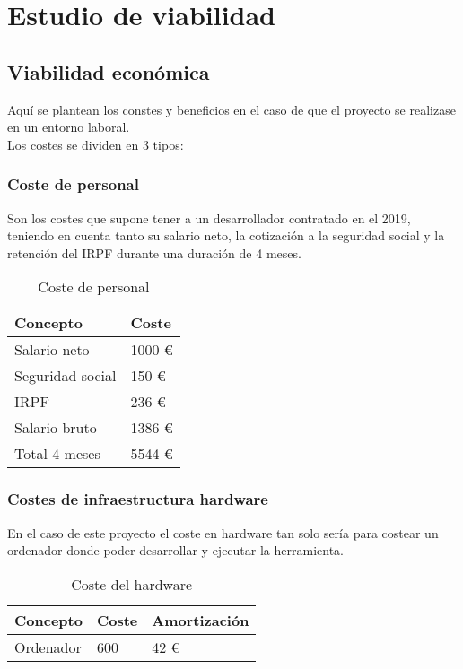 \section{Estudio de viabilidad}

\subsection{Viabilidad económica}
Aquí se plantean los constes y beneficios en el caso de que el proyecto se realizase en un entorno laboral.\\

Los costes se dividen en 3 tipos:


\subsubsection{Coste de personal}

Son los costes que supone tener a un desarrollador contratado en el 2019, teniendo en cuenta tanto su salario neto, la cotización a la seguridad social y la retención del IRPF durante una duración de 4 meses.\\

\begin{table}[H]
\begin{center}
\begin{tabular}{|l|l|}
\hline
Concepto & Coste \\
\hline \hline
Salario neto & 1000 \euro \\ \hline
Seguridad social & 150 \euro \\ \hline
IRPF & 236 \euro \\ \hline
Salario bruto & 1386 \euro \\ \hline
Total 4 meses & 5544 \euro \\ \hline
\end{tabular}
\caption{Coste de personal}

\label{tabla:sencilla}
\end{center}
\end{table}


\subsubsection{Costes de infraestructura hardware}
En el caso de este proyecto el coste en hardware tan solo sería para costear un ordenador donde poder desarrollar y ejecutar la herramienta.\\

\begin{table}[H]
\begin{center}
\begin{tabular}{|l|l|l|}
\hline
Concepto & Coste & Amortización\\
\hline \hline
Ordenador & 600 & 42 \euro \\ \hline
\end{tabular}
\caption{Coste del hardware}

\label{tabla:sencilla}
\end{center}
\end{table}


